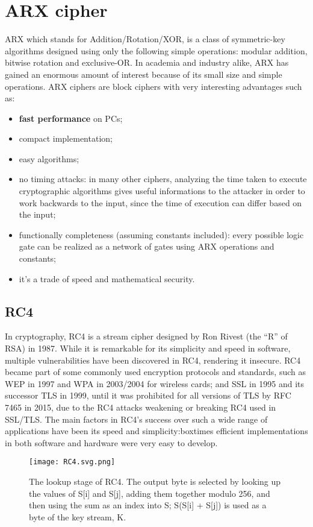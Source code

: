 \documentclass{article}
\begin{document}
\section{ARX cipher}
ARX which stands for Addition/Rotation/XOR, is a class of symmetric-key algorithms designed using only the following simple operations: modular addition, bitwise rotation and exclusive-OR. In academia and industry alike, ARX has gained an enormous amount of interest because of its small size and simple operations.
ARX ciphers are block ciphers with very interesting advantages such as:
\begin{itemize}
\item \textbf{fast performance} on PCs;
\item compact implementation;
\item easy algorithms;
\item no timing attacks: in many other ciphers, analyzing the time taken to execute cryptographic algorithms gives useful informations to the attacker in order to work backwards to the input, since the time of execution can differ based on the input;
\item functionally completeness (assuming constants included): every possible logic gate can be realized as a network of gates using ARX operations and constants;
\item it's a trade of speed and mathematical security.
\end{itemize}
\subsection{RC4}
In cryptography, RC4 is a stream cipher designed by Ron Rivest (the “R” of RSA) in 1987.  While it is remarkable for its simplicity and speed in software, multiple vulnerabilities have been discovered in RC4, rendering it insecure. RC4 became part of some commonly used encryption protocols and standards, such as WEP in 1997 and WPA in 2003/2004 for wireless cards; and SSL in 1995 and its successor TLS in 1999, until it was prohibited for all versions of TLS by RFC 7465 in 2015, due to the RC4 attacks weakening or breaking RC4 used in SSL/TLS. The main factors in RC4's success over such a wide range of applications have been its speed and simplicity:boxtimes efficient implementations in both software and hardware were very easy to develop.
\begin{figure}[htb]
	\begin{center}
  		\texttt{[image: RC4.svg.png]} 
 	\end{center}
 	\caption{The lookup stage of RC4. The output byte is selected by looking up the values of S[i] and S[j], adding them together modulo 256, and then using the sum as an index into S; S(S[i] + S[j]) is used as a byte of the key stream, K.}
\end{figure}
\newpage
\end{document}
